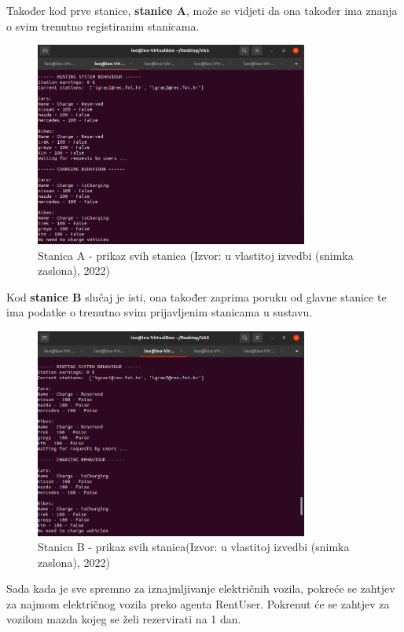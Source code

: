 \documentclass{foi}
\begin{document}
Također kod prve stanice, \textbf{stanice A}, može se vidjeti da ona također ima znanja o svim trenutno registiranim stanicama.

\begin{figure}[H]
	\centering
	\includegraphics[width=0.8\textwidth]{slike/vas5}
	\caption{Stanica A - prikaz svih stanica (Izvor: u vlastitoj izvedbi (snimka zaslona), 2022)}
\end{figure}

Kod \textbf{stanice B} slučaj je isti, ona također zaprima poruku od glavne stanice te ima podatke o trenutno svim prijavljenim stanicama u sustavu.

\begin{figure}[H]
	\centering
	\includegraphics[width=0.8\textwidth]{slike/vas6}
	\caption{Stanica B - prikaz svih stanica(Izvor: u vlastitoj izvedbi (snimka zaslona), 2022)}
\end{figure}

Sada kada je sve spremno za iznajmljivanje električnih vozila, pokreće se zahtjev za najmom električnog vozila preko agenta RentUser. Pokrenut će se zahtjev za vozilom mazda kojeg se želi rezervirati na 1 dan.
\end{document}
